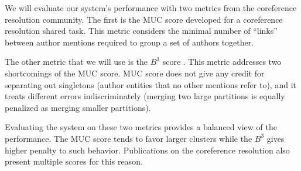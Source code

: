 \documentclass[twocolumn,letterpaper]{article}
\begin{document}
We will evaluate our system's performance with two metrics from the
coreference resolution community.  The first is the MUC score
\cite{Vilain95} developed for a coreference resolution shared task.
This metric considers the minimal number of ``links'' between author
mentions required to group a set of authors together.

The other metric that we will use is the $B^3$ score \cite{Bagga98b}.
This metric addresses two shortcomings of the MUC score.  MUC score
does not give any credit for separating out singletons (author
entities that no other mentions refer to), and it treats different
errors indiscriminately (merging two large partitions is equally
penalized as merging smaller partitions).

Evaluating the system on these two metrics provides a balanced view of
the performance.  The MUC score tends to favor larger clusters while
the $B^3$ gives higher penalty to such behavior.  Publications on the
coreference resolution also present multiple scores for this reason.



\end{document}
